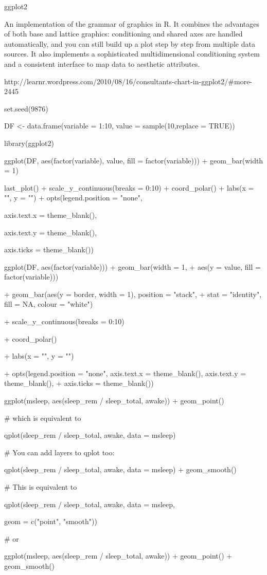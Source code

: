 ggplot2


An implementation of the grammar of graphics in R. It combines the advantages of both base and lattice graphics: conditioning and shared axes are handled automatically, and you can still build up a plot step by step from multiple data sources. It also implements a sophisticated multidimensional conditioning system and a consistent interface to map data to aesthetic attributes.


http://learnr.wordpress.com/2010/08/16/consultants-chart-in-ggplot2/#more-2445








set.seed(9876)

DF <- data.frame(variable = 1:10, value = sample(10,replace = TRUE))

library(ggplot2)

ggplot(DF, aes(factor(variable), value, fill = factor(variable))) + geom_bar(width = 1)

last_plot() + scale_y_continuous(breaks = 0:10) + coord_polar() + labs(x = "", y = "") + opts(legend.position = "none", 

    axis.text.x = theme_blank(), 

    axis.text.y = theme_blank(), 

    axis.ticks = theme_blank())
 








ggplot(DF, aes(factor(variable))) + geom_bar(width = 1, + aes(y = value, fill = factor(variable)))

+ geom_bar(aes(y = border, width = 1), position = "stack", + stat = "identity", fill = NA, colour = "white")  

+ scale_y_continuous(breaks = 0:10)

+ coord_polar()  

+ labs(x = "", y = "")

+ opts(legend.position = "none", axis.text.x = theme_blank(), axis.text.y = theme_blank(), + axis.ticks = theme_blank())
 









ggplot(msleep, aes(sleep_rem / sleep_total, awake)) + geom_point()


# which is equivalent to


qplot(sleep_rem / sleep_total, awake, data = msleep)


# You can add layers to qplot too:


qplot(sleep_rem / sleep_total, awake, data = msleep) + geom_smooth()


# This is equivalent to


qplot(sleep_rem / sleep_total, awake, data = msleep,


geom = c("point", "smooth"))


# or


ggplot(msleep, aes(sleep_rem / sleep_total, awake)) + geom_point() + geom_smooth()
 



